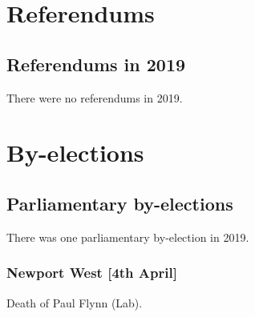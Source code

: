 \documentclass[a4paper,openany]{book}
\begin{document}
 
 



\part{Referendums}

\chapter{Referendums in 2019}

There were no referendums in 2019.

%
%

\part{By-elections}

\chapter{Parliamentary by-elections}

There was one parliamentary by-election in 2019.

\section*{Newport West \hspace*{\fill}\nolinebreak[1]%
\enspace\hspace*{\fill}
[4th April]}


Death of Paul Flynn (Lab).
\end{document}
